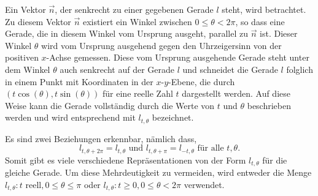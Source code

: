 Ein Vektor $\vec{n}$, der senkrecht zu einer gegebenen Gerade $l$ steht, wird betrachtet. Zu diesem Vektor $\vec{n}$ existiert ein Winkel zwischen $0 \le \theta < 2\pi$, so dass eine Gerade, die in diesem Winkel vom Ursprung ausgeht, parallel zu $\vec{n}$ ist. Dieser Winkel $\theta$ wird vom Ursprung ausgehend gegen den Uhrzeigersinn von der positiven $x$-Achse gemessen. Diese vom Ursprung ausgehende Gerade steht unter dem Winkel $\theta$ auch senkrecht auf der Gerade $l$ und schneidet die Gerade $l$ folglich in einem Punkt mit Koordinaten in der $x$-$y$-Ebene, die durch $(t\cos(\theta), t\sin(\theta))$ für eine reelle Zahl $t$ dargestellt werden. Auf diese Weise kann die Gerade vollständig durch die Werte von $t$ und $\theta$ beschrieben werden und wird entsprechend mit $l_{t,\theta}$ bezeichnet.

Es sind zwei Beziehungen erkennbar, nämlich dass,
\begin{equation}
	l_{t,\theta+2\pi} = l_{t,\theta} \text{ und } l_{t,\theta+\pi} = l_{-t,\theta} \text{ für alle } t, \theta.
\nonumber\end{equation}
\sloppy Somit gibt es viele verschiedene Repräsentationen von der Form $l_{t,\theta}$ für die gleiche Gerade. Um diese Mehrdeutigkeit zu vermeiden, wird entweder die Menge $l_{t,\theta}: t \text{ reell},  0 \le \theta \le \pi$ oder $l_{t,\theta} : t \ge 0,  0 \le \theta < 2\pi$ verwendet.
